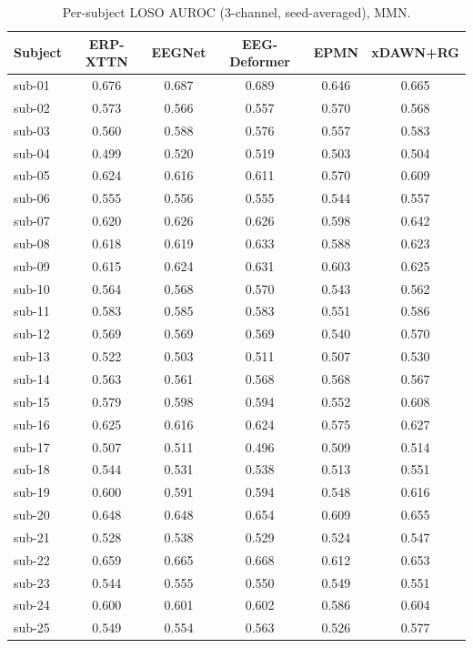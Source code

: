 \begin{table}[t]
\centering
\scriptsize
\caption{Per-subject LOSO AUROC (3-channel, seed-averaged), MMN.}
\label{tab:persubj-mmn}
\begin{tabular}{lccccc}
\toprule
Subject & ERP-XTTN & EEGNet & EEG-Deformer & EPMN & xDAWN+RG \\
\midrule
sub-01 & 0.676 & 0.687 & 0.689 & 0.646 & 0.665 \\
sub-02 & 0.573 & 0.566 & 0.557 & 0.570 & 0.568 \\
sub-03 & 0.560 & 0.588 & 0.576 & 0.557 & 0.583 \\
sub-04 & 0.499 & 0.520 & 0.519 & 0.503 & 0.504 \\
sub-05 & 0.624 & 0.616 & 0.611 & 0.570 & 0.609 \\
sub-06 & 0.555 & 0.556 & 0.555 & 0.544 & 0.557 \\
sub-07 & 0.620 & 0.626 & 0.626 & 0.598 & 0.642 \\
sub-08 & 0.618 & 0.619 & 0.633 & 0.588 & 0.623 \\
sub-09 & 0.615 & 0.624 & 0.631 & 0.603 & 0.625 \\
sub-10 & 0.564 & 0.568 & 0.570 & 0.543 & 0.562 \\
sub-11 & 0.583 & 0.585 & 0.583 & 0.551 & 0.586 \\
sub-12 & 0.569 & 0.569 & 0.569 & 0.540 & 0.570 \\
sub-13 & 0.522 & 0.503 & 0.511 & 0.507 & 0.530 \\
sub-14 & 0.563 & 0.561 & 0.568 & 0.568 & 0.567 \\
sub-15 & 0.579 & 0.598 & 0.594 & 0.552 & 0.608 \\
sub-16 & 0.625 & 0.616 & 0.624 & 0.575 & 0.627 \\
sub-17 & 0.507 & 0.511 & 0.496 & 0.509 & 0.514 \\
sub-18 & 0.544 & 0.531 & 0.538 & 0.513 & 0.551 \\
sub-19 & 0.600 & 0.591 & 0.594 & 0.548 & 0.616 \\
sub-20 & 0.648 & 0.648 & 0.654 & 0.609 & 0.655 \\
sub-21 & 0.528 & 0.538 & 0.529 & 0.524 & 0.547 \\
sub-22 & 0.659 & 0.665 & 0.668 & 0.612 & 0.653 \\
sub-23 & 0.544 & 0.555 & 0.550 & 0.549 & 0.551 \\
sub-24 & 0.600 & 0.601 & 0.602 & 0.586 & 0.604 \\
sub-25 & 0.549 & 0.554 & 0.563 & 0.526 & 0.577 \\

\end{tabular}
\end{table}
